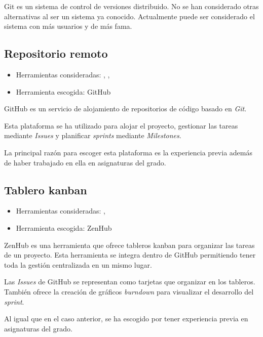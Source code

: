 Git es un sistema de control de versiones distribuido. No se han considerado
otras alternativas al ser un sistema ya conocido. Actualmente puede ser
considerado el sistema con más usuarios y de más fama.

\subsection{Repositorio remoto}

\begin{itemize}
	\tightlist
	\item Herramientas consideradas: ,
	,
	\item Herramienta escogida: GitHub
\end{itemize}

GitHub es un servicio de alojamiento de repositorios de código basado en
\textit{Git}.

Esta plataforma se ha utilizado para alojar el proyecto, gestionar las tareas
mediante \textit{Issues} y planificar \textit{sprints} mediante
\textit{Milestones}.

La principal razón para escoger esta plataforma es la experiencia previa además
de haber trabajado en ella en asignaturas del grado.

\subsection{Tablero kanban}

\begin{itemize}
	\tightlist
	\item Herramientas consideradas:
	,
	\item Herramienta escogida: ZenHub
\end{itemize}

ZenHub es una herramienta que ofrece tableros kanban para organizar las tareas
de un proyecto. Esta herramienta se integra dentro de GitHub permitiendo tener
toda la gestión centralizada en un mismo lugar.

Las \textit{Issues} de GitHub se representan como tarjetas que organizar en los
tableros. También ofrece la creación de gráficos \textit{burndown} para
visualizar el desarrollo del \textit{sprint}. 

Al igual que en el caso anterior, se ha escogido por tener experiencia previa en
asignaturas del grado.

